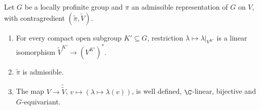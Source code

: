 Let $G$ be a locally profinite group and $\pi$ an admissible representation of $G$ on $V$, with contragredient
$(\tilde\pi,\tilde V)$.
\begin{enumerate}[label=(\alph*)]
\item For every compact open subgroup $K'\subseteq G$, restriction $\lambda\mapsto\lambda|_{V^{K'}}$ is a linear
  isomorphism $\tilde V^{K'}\to(V^{K'})^*$.
\item $\tilde\pi$ is admissible.
\item The map $V\to\tilde{\tilde V}$, $v\mapsto(\lambda\mapsto\lambda(v))$, is well defined, $\C$-linear, bijective and
  $G$-equivariant.
\end{enumerate}

